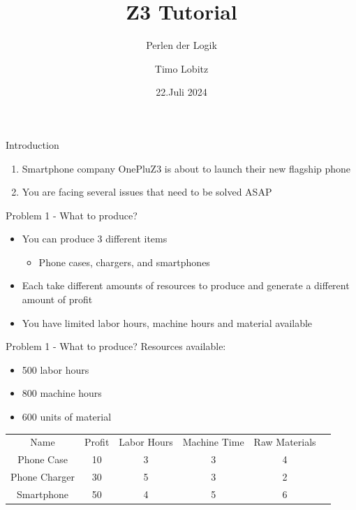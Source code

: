 \documentclass[t, ]{beamer}
\title{Z3 Tutorial}
\subtitle{Perlen der Logik}
\author{Timo Lobitz}
\date{22.Juli 2024}
\begin{document}
\begin{frame}
    \titlepage
\end{frame}
\begin{frame}{Introduction}
	\begin{enumerate}
		\item Smartphone company OnePluZ3 is about to launch their new flagship phone
		\item You are facing several issues that need to be solved ASAP
	\end{enumerate}
	
\end{frame}
\begin{frame}{Problem 1 - What to produce?}
	\begin{itemize}
		\item You can produce 3 different items
		\begin{itemize}
			\item Phone cases, chargers, and smartphones
		\end{itemize}
		\item Each take different amounts of resources to produce and generate a different amount of profit
		\item You have limited labor hours, machine hours and material available
	\end{itemize}
	
\end{frame}

\begin{frame}{Problem 1 - What to produce?}
	Resources available:
	\begin{itemize}
		\item 500 labor hours
		\item 800 machine hours
		\item 600 units of material
	\end{itemize}
	
	\begin{table}
		\centering
		\begin{tabular}{cccccc}
			Name &  Profit & Labor Hours & Machine Time & Raw Materials \\
			Phone Case &  10 & 3 & 3 & 4\\
			Phone Charger & 30  & 5  & 3 &2 \\
			Smartphone & 50  & 4 & 5 & 6\\
		\end{tabular}
		\label{tab:resource_cost}
	\end{table}
	
\end{frame}
\end{document}
